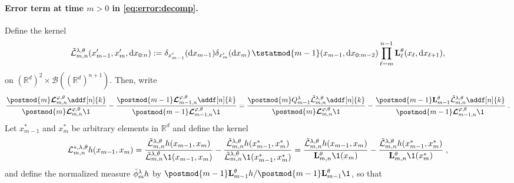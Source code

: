 \documentclass{article}
\begin{document}
\paragraph{Error term at time $m>0$ in \eqref{eq:error:decomp}. } Define the kernel  
\begin{equation} \label{eq:def:retrokmod:joint}
    \tilde{\mathcal{L}}^{\parvar,\parvec}_{m, n}(x'_{m-1},x_m', \rmd x_{0:n}) \eqdef \delta_{x'_{m-1}}(\rmd x_{m-1})\delta_{x_m'}(\rmd x_m) \, \tstatmod{m-1}(x_{m-1}, \rmd x_{0:m - 2}) \prod_{\ell = m}^{n - 1} \uk{\ell}{\parvec}(x_\ell, \rmd x_{\ell + 1}), 
\end{equation}
on  $(\mathbb{R}^d)^2 \times \mathcal{B}((\mathbb{R}^d)^{n+1})$.  
Then, write
$$
\frac{\postmod{m} \retrokmod_{m, n} \addf[n]{k}}{\postmod{m} \retrokmod_{m, n} \1_{}}
- \frac{\postmod{m - 1} \retrokmod_{m - 1, n} \addf[n]{k}}{\postmod{m - 1} \retrokmod_{m - 1, n} \1_{}}  = \frac{\postmod{m} Q_{m-1}^{\parvar} \tilde{\mathcal{L}}^{\parvar,\parvec}_{m, n} \addf[n]{k}}{\postmod{m} \retrokmod_{m, n} \1_{}}
- \frac{\postmod{m - 1} \uk{m-1}{\parvec} \tilde{\mathcal{L}}^{\parvar,\parvec}_{m, n} \addf[n]{k}}{\postmod{m - 1} \retrokmod_{m - 1, n} \1_{}} \eqsp.
$$
Let $x_{m-1}^*$ and $x_m^*$ be arbitrary elements in $\mathbb{R}^d$ and define the kernel
$$
\mathcal{L}^{*,\parvar,\parvec}_{m, n}h(x_{m-1},x_m) = \frac{\tilde{\mathcal{L}}^{\parvar,\parvec}_{m, n}h(x_{m-1},x_m) }{\tilde{\mathcal{L}}^{\parvar,\parvec}_{m, n}\1(x_{m-1},x_m)} - \frac{\tilde{\mathcal{L}}^{\parvar,\parvec}_{m, n}h(x^*_{m-1},x^*_m) }{\tilde{\mathcal{L}}^{\parvar,\parvec}_{m, n}\1(x^*_{m-1},x^*_m)} = \frac{\tilde{\mathcal{L}}^{\parvar,\parvec}_{m, n}h(x_{m-1},x_m) }{\uk{m, n}{\parvec}\1(x_m)} - \frac{\tilde{\mathcal{L}}^{\parvar,\parvec}_{m, n}h(x^*_{m-1},x^*_m) }{\uk{m, n}{\parvec}\1(x^*_m)}\eqsp,
$$
and define the normalized measure $\tilde\phi^\lambda_mh$ by $\postmod{m - 1} \uk{m-1}{\parvec}h/\postmod{m - 1} \uk{m-1}{\parvec}\1$, so that
\end{document}
